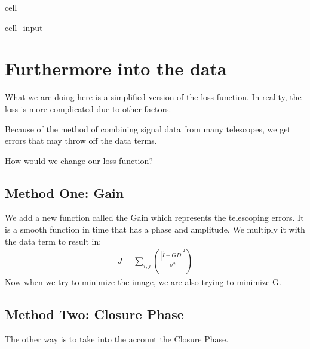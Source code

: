 \documentclass[letterpaper,10pt,english]{jupyterBook}
\begin{document}
\begin{sphinxuseclass}{cell}
\begin{sphinxVerbatimInput}
\begin{sphinxuseclass}{cell_input}
\begin{sphinxVerbatim}[commandchars=\\\{\}]
           
\end{sphinxVerbatim}

\end{sphinxuseclass}\end{sphinxVerbatimInput}

\end{sphinxuseclass}

\section{Furthermore into the data}
\label{\detokenize{loss:furthermore-into-the-data}}
\sphinxAtStartPar
What we are doing here is a simplified version of the loss function. In reality, the loss is more complicated due to other factors.

\sphinxAtStartPar
Because of the method of combining signal data from many telescopes, we get errors that may throw off the data terms.

\sphinxAtStartPar
How would we change our loss function?


\subsection{Method One: Gain}
\label{\detokenize{loss:method-one-gain}}
\sphinxAtStartPar
We add a new function called the Gain which represents the telescoping errors. It is a smooth function in time that has a phase and amplitude. We multiply it with the data term to result in:
\begin{equation*}
\begin{split}J = \sum_{i,j}(\frac{|\hat{I} - G D|^2}{\sigma^2})\end{split}
\end{equation*}
\sphinxAtStartPar
Now when we try to minimize the image, we are also trying to minimize G.


\subsection{Method Two: Closure Phase}
\label{\detokenize{loss:method-two-closure-phase}}
\sphinxAtStartPar
The other way is to take into the account the Closure Phase.
\end{document}
